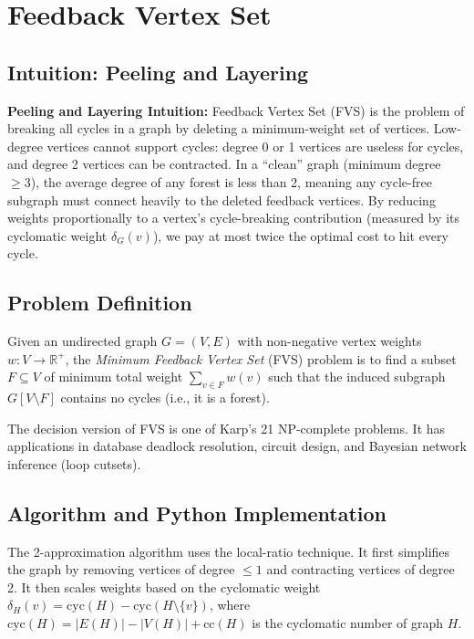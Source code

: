 \documentclass[11pt,oneside]{book}
\begin{document}
\chapter{Feedback Vertex Set}
\label{ch:fvs}

\section{Intuition: Peeling and Layering}

\begin{intuitionbox}
\textbf{Peeling and Layering Intuition:} Feedback Vertex Set (FVS) is the problem of breaking all cycles in a graph by deleting a minimum-weight set of vertices. Low-degree vertices cannot support cycles: degree 0 or 1 vertices are useless for cycles, and degree 2 vertices can be contracted. In a ``clean'' graph (minimum degree $\ge 3$), the average degree of any forest is less than 2, meaning any cycle-free subgraph must connect heavily to the deleted feedback vertices. By reducing weights proportionally to a vertex's cycle-breaking contribution (measured by its cyclomatic weight $\delta_G(v)$), we pay at most twice the optimal cost to hit every cycle.
\end{intuitionbox}

\section{Problem Definition}
Given an undirected graph $G = (V, E)$ with non-negative vertex weights $w: V \to \mathbb{R}^+$, the \emph{Minimum Feedback Vertex Set} (FVS) problem is to find a subset $F \subseteq V$ of minimum total weight $\sum_{v \in F} w(v)$ such that the induced subgraph $G[V \setminus F]$ contains no cycles (i.e., it is a forest).

The decision version of FVS is one of Karp's 21 NP-complete problems. It has applications in database deadlock resolution, circuit design, and Bayesian network inference (loop cutsets).

\section{Algorithm and Python Implementation}
The 2-approximation algorithm uses the local-ratio technique. It first simplifies the graph by removing vertices of degree $\le 1$ and contracting vertices of degree 2. It then scales weights based on the cyclomatic weight $\delta_H(v) = \text{cyc}(H) - \text{cyc}(H \setminus \{v\})$, where $\text{cyc}(H) = |E(H)| - |V(H)| + \text{cc}(H)$ is the cyclomatic number of graph $H$.
\end{document}
